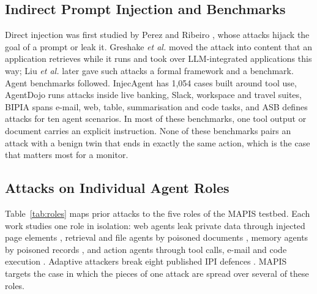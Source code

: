 \documentclass{ieeeaccess}
\begin{document}
\subsection{Indirect Prompt Injection and Benchmarks}
Direct injection was first studied by Perez and Ribeiro \cite{perez2022}, whose attacks hijack the goal of a prompt or leak it. Greshake \emph{et al.} \cite{greshake2023} moved the attack into content that an application retrieves while it runs and took over LLM-integrated applications this way; Liu \emph{et al.} \cite{liu2024formalizing} later gave such attacks a formal framework and a benchmark. Agent benchmarks followed. InjecAgent \cite{zhan2024injecagent} has 1,054 cases built around tool use, AgentDojo \cite{debenedetti2024agentdojo} runs attacks inside live banking, Slack, workspace and travel suites, BIPIA \cite{yi2025bipia} spans e-mail, web, table, summarisation and code tasks, and ASB \cite{zhang2025asb} defines attacks for ten agent scenarios. In most of these benchmarks, one tool output or document carries an explicit instruction. None of these benchmarks pairs an attack with a benign twin that ends in exactly the same action, which is the case that matters most for a monitor.

\subsection{Attacks on Individual Agent Roles}
Table~\ref{tab:roles} maps prior attacks to the five roles of the MAPIS testbed. Each work studies one role in isolation: web agents leak private data through injected page elements \cite{liao2025eia}, retrieval and file agents by poisoned documents \cite{greshake2023,zou2025poisonedrag}, memory agents by poisoned records \cite{chen2024agentpoison,dong2025minja}, and action agents through tool calls, e-mail and code execution \cite{zhan2024injecagent,cohen2024worm,triedman2025mas}. Adaptive attackers break eight published IPI defences \cite{zhan2025adaptive}. MAPIS targets the case in which the pieces of one attack are spread over several of these roles.
\end{document}

